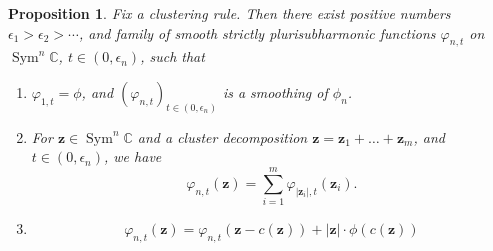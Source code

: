 \documentclass{article}
\def\C{\mathbb{C}}
\DeclareMathOperator{\Sym}{Sym}
\newtheorem{proposition}[theorem]{Proposition}
\theoremstyle{definition}
\begin{document}
\begin{proposition}\label{pp: smoothing-KP}
Fix a clustering rule.  Then there exist positive numbers $\epsilon_1 > \epsilon_2 >  \cdots$, and  family of smooth strictly plurisubharmonic functions $\varphi_{n,t}$ on $\Sym^n \C$, $t \in (0, \epsilon_n)$, such that 

\begin{enumerate}
\item \label{normalization and smoothing condition} $\varphi_{1,t} = \phi$, and $(\varphi_{n,t})_{t \in (0, \epsilon_n)}$ is a smoothing of $\phi_n$. 
    \item \label{cluster additivity condition}
    For $\mathbf{z} \in \Sym^n \C$ and a cluster decomposition  $\mathbf{z} = \mathbf{z}_1 + \ldots + \mathbf{z}_m$, and $t \in (0, \epsilon_n)$, we have 
    \begin{equation}\label{cluster additive} \varphi_{n,t}(\mathbf{z}) = \sum_{i=1}^m \varphi_{|\mathbf{z}_i|,t}(\mathbf{z}_i). 
    \end{equation}
    \item  \label{center of mass condition}  
    $$\varphi_{n, t}(\mathbf{z}) = \varphi_{n, t}(\mathbf{z} - c(\mathbf{z})) + |\mathbf{z}| \cdot  \phi(c(\mathbf{z}))$$
\end{enumerate}
\end{proposition}
\end{document}
